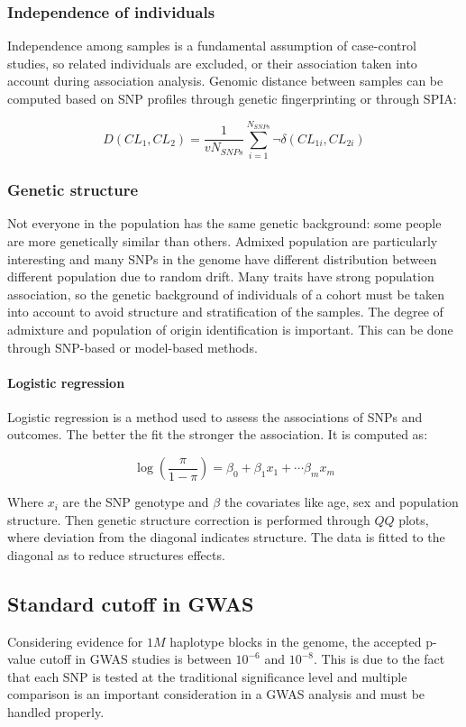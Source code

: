 		\subsubsection{Independence of individuals}
		Independence among samples is a fundamental assumption of case-control studies, so related individuals are excluded, or their association taken into account during association analysis.
		Genomic distance between samples can be computed based on SNP profiles through genetic fingerprinting or through SPIA:

		$$D(CL_1, CL_2) = \frac{1}{vN_{SNPs}} \sum\limits_{i=1}^{N_{SNPs}} \neg\delta(CL_{1i}, CL_{2i})$$

		\subsubsection{Genetic structure}
		Not everyone in the population has the same genetic background: some people are more genetically similar than others.
		Admixed population are particularly interesting and many SNPs in the genome have different distribution between different population due to random drift.
		Many traits have strong population association, so the genetic background of individuals of a cohort must be taken into account to avoid structure and stratification of the samples.
		The degree of admixture and population of origin identification is important.
		This can be done through SNP-based or model-based methods.

			\paragraph{Logistic regression}
			Logistic regression is a method used to assess the associations of SNPs and outcomes.
			The better the fit the stronger the association.
			It is computed as:

			$$\log(\frac{\pi}{1-\pi}) = \beta_0+\beta_1x_1+\cdots \beta_mx_m$$

			Where $x_i$ are the SNP genotype and $\beta$ the covariates like age, sex and population structure.
			Then genetic structure correction is performed through $QQ$ plots, where deviation from the diagonal indicates structure.
			The data is fitted to the diagonal as to reduce structures effects.

	\subsection{Standard cutoff in GWAS}
	Considering evidence for $1M$ haplotype blocks in the genome, the accepted p-value cutoff in GWAS studies is between $10^{-6}$ and $10^{-8}$.
	This is due to the fact that each SNP is tested at the traditional significance level and multiple comparison is an important consideration in a GWAS analysis and must be handled properly.

